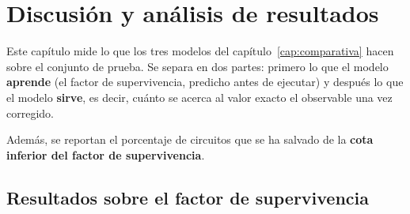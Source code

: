 \chapter{Discusión y análisis de resultados}
\label{cap:resultados}

%
%
%
%

Este capítulo mide lo que los tres modelos del capítulo~\ref{cap:comparativa} hacen sobre el
conjunto de prueba. Se separa en dos partes: primero lo que el
modelo \textbf{aprende} (el factor de supervivencia, predicho antes de ejecutar) y después lo
que el modelo \textbf{sirve}, es decir, cuánto se acerca al valor exacto el observable una vez
corregido.

Además, se reportan el porcentaje de circuitos que se ha salvado de la \textbf{cota inferior del factor de supervivencia}.


\section{Resultados sobre el factor de supervivencia}
\label{sec:res_factor}


